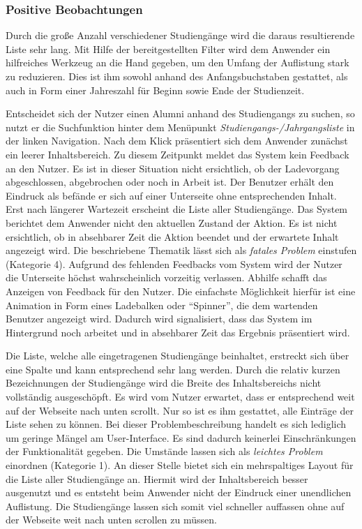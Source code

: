
\subsubsection*{Positive Beobachtungen}
Durch die große Anzahl verschiedener Studiengänge wird die daraus resultierende Liste sehr lang. Mit Hilfe der bereitgestellten Filter wird dem Anwender ein hilfreiches Werkzeug an die Hand gegeben, um den Umfang der Auflistung stark zu reduzieren. Dies ist ihm sowohl anhand des Anfangsbuchstaben gestattet, als auch in Form einer Jahreszahl für Beginn sowie Ende der Studienzeit. 

{
	Entscheidet sich der Nutzer einen Alumni anhand des Studiengangs zu suchen, so nutzt er die Suchfunktion hinter dem Menüpunkt \emph{Studiengangs-/Jahrgangsliste} in der linken Navigation. Nach dem Klick präsentiert sich dem Anwender zunächst ein leerer Inhaltsbereich. Zu diesem Zeitpunkt meldet das System kein Feedback an den Nutzer. Es ist in dieser Situation nicht ersichtlich, ob der Ladevorgang abgeschlossen, abgebrochen oder noch in Arbeit ist. Der Benutzer erhält den Eindruck als befände er sich auf einer Unterseite ohne entsprechenden Inhalt. Erst nach längerer Wartezeit erscheint die Liste aller Studiengänge.
}
{
	Das System berichtet dem Anwender nicht den aktuellen Zustand der Aktion. Es ist nicht ersichtlich, ob in absehbarer Zeit die Aktion beendet und der erwartete Inhalt angezeigt wird. Die beschriebene Thematik lässt sich als \emph{fatales Problem} einstufen (Kategorie 4). Aufgrund des fehlenden Feedbacks vom System wird der Nutzer die Unterseite höchst wahrscheinlich vorzeitig verlassen. 
}
{
	Abhilfe schafft das Anzeigen von Feedback für den Nutzer. Die einfachste Möglichkeit hierfür ist eine Animation in Form eines Ladebalken oder “Spinner”, die dem wartenden Benutzer angezeigt wird. Dadurch wird signalisiert, dass das System im Hintergrund noch arbeitet und in absehbarer Zeit das Ergebnis präsentiert wird.
}
\label{prob:suche:keinfeedback}

{
	Die Liste, welche alle eingetragenen Studiengänge beinhaltet, erstreckt sich über eine Spalte und kann entsprechend sehr lang werden. Durch die relativ kurzen Bezeichnungen der Studiengänge wird die Breite des Inhaltsbereichs nicht vollständig ausgeschöpft. Es wird vom Nutzer erwartet, dass er entsprechend weit auf der Webseite nach unten scrollt. Nur so ist es ihm gestattet, alle Einträge der Liste sehen zu können.
}
{
	Bei dieser Problembeschreibung handelt es sich lediglich um geringe Mängel am User-Interface. Es sind dadurch keinerlei Einschränkungen der Funktionalität gegeben. Die Umstände lassen sich als \emph{leichtes Problem} einordnen (Kategorie 1).
}
{
	An dieser Stelle bietet sich ein mehrspaltiges Layout für die Liste aller Studiengänge an. Hiermit wird der Inhaltsbereich besser ausgenutzt und es entsteht beim Anwender nicht der Eindruck einer unendlichen Auflistung. Die Studiengänge lassen sich somit viel schneller auffassen ohne auf der Webseite weit nach unten scrollen zu müssen.
}
\label{prob:suche:studiengangsliste}

